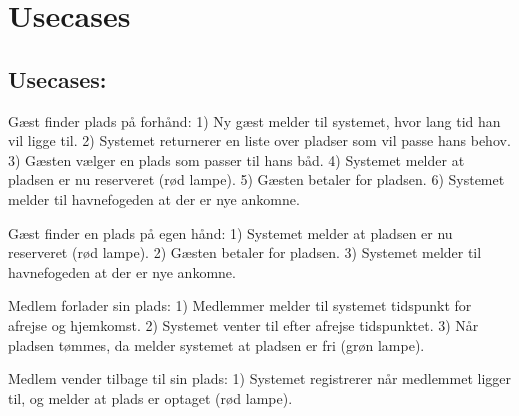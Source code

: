 \section{Usecases}

\subsection{Usecases:}

Gæst finder plads på forhånd:
1) Ny gæst melder til systemet, hvor lang tid han vil ligge til.
2) Systemet returnerer en liste over pladser som vil passe hans behov.
3) Gæsten vælger en plads som passer til hans båd.
4) Systemet melder at pladsen er nu reserveret (rød lampe).
5) Gæsten betaler for pladsen.
6) Systemet melder til havnefogeden at der er nye ankomne.

Gæst finder en plads på egen hånd:
1) Systemet melder at pladsen er nu reserveret (rød lampe).
2) Gæsten betaler for pladsen.
3) Systemet melder til havnefogeden at der er nye ankomne.

Medlem forlader sin plads:
1) Medlemmer melder til systemet tidspunkt for afrejse og hjemkomst.
2) Systemet venter til efter afrejse tidspunktet.
3) Når pladsen tømmes, da melder systemet at pladsen er fri (grøn lampe).

Medlem vender tilbage til sin plads:
1) Systemet registrerer når medlemmet ligger til, og melder at plads er optaget (rød lampe).

